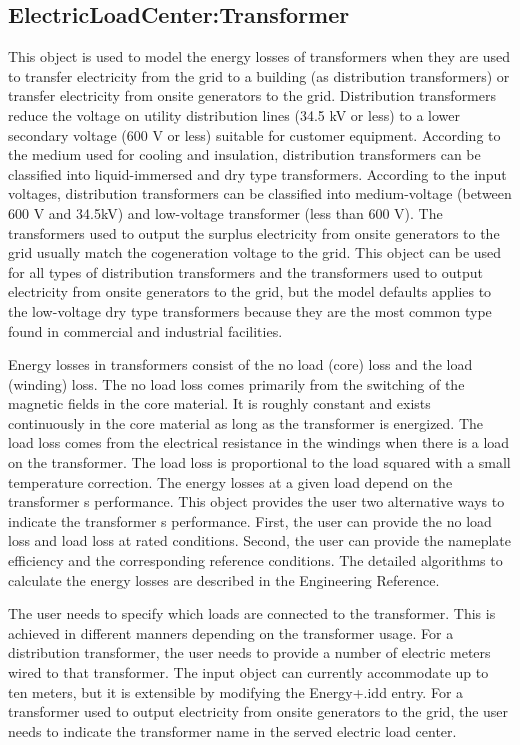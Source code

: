 \subsection{ElectricLoadCenter:Transformer}\label{electricloadcentertransformer}

This object is used to model the energy losses of transformers when they are used to transfer electricity from the grid to a building (as distribution transformers) or transfer electricity from onsite generators to the grid. Distribution transformers reduce the voltage on utility distribution lines (34.5 kV or less) to a lower secondary voltage (600 V or less) suitable for customer equipment. According to the medium used for cooling and insulation, distribution transformers can be classified into liquid-immersed and dry type transformers. According to the input voltages, distribution transformers can be classified into medium-voltage (between 600 V and 34.5kV) and low-voltage transformer (less than 600 V). The transformers used to output the surplus electricity from onsite generators to the grid usually match the cogeneration voltage to the grid. This object can be used for all types of distribution transformers and the transformers used to output electricity from onsite generators to the grid, but the model defaults applies to the low-voltage dry type transformers because they are the most common type found in commercial and industrial facilities.

Energy losses in transformers consist of the no load (core) loss and the load (winding) loss. The no load loss comes primarily from the switching of the magnetic fields in the core material. It is roughly constant and exists continuously in the core material as long as the transformer is energized. The load loss comes from the electrical resistance in the windings when there is a load on the transformer. The load loss is proportional to the load squared with a small temperature correction. The energy losses at a given load depend on the transformer s performance. This object provides the user two alternative ways to indicate the transformer s performance. First, the user can provide the no load loss and load loss at rated conditions. Second, the user can provide the nameplate efficiency and the corresponding reference conditions. The detailed algorithms to calculate the energy losses are described in the Engineering Reference.

The user needs to specify which loads are connected to the transformer. This is achieved in different manners depending on the transformer usage. For a distribution transformer, the user needs to provide a number of electric meters wired to that transformer. The input object can currently accommodate up to ten meters, but it is extensible by modifying the Energy+.idd entry. For a transformer used to output electricity from onsite generators to the grid, the user needs to indicate the transformer name in the served electric load center.

